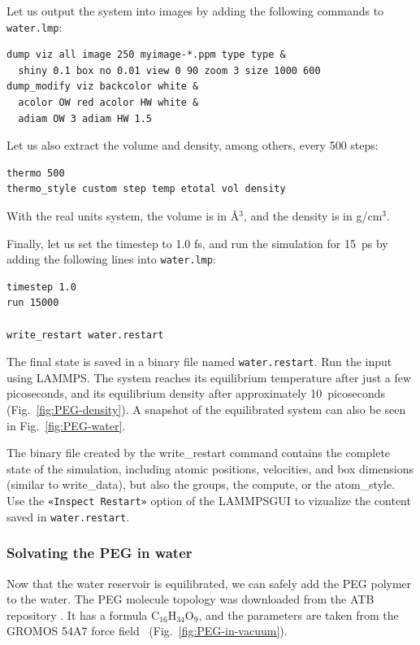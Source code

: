 \documentclass[9pt,tutorial]{livecoms}
\newcommand{\lmpcmdnote}[1]{\colorbox{note_listing}{\textcolor{command}{\small{#1}}}} %
\newcommand{\flecmd}[1]{\textcolor{command}{\texttt{#1}}} %
\newcommand{\guicmd}[1]{\textcolor{command}{\texttt{«#1»}}} %
\newcommand{\lammpsgui}{\textsf{LAMMPS\textendash GUI}}
\begin{document}
Let us output the system into images by adding the following commands to \flecmd{water.lmp}:
\begin{lstlisting}
dump viz all image 250 myimage-*.ppm type type &
  shiny 0.1 box no 0.01 view 0 90 zoom 3 size 1000 600
dump_modify viz backcolor white &
  acolor OW red acolor HW white &
  adiam OW 3 adiam HW 1.5
\end{lstlisting}
Let us also extract the volume and density, among others, every 500 steps:
\begin{lstlisting}
thermo 500
thermo_style custom step temp etotal vol density
\end{lstlisting}
With the real units system, the volume is in Å$^3$, and
the density is in g/cm$^3$.

Finally, let us set the timestep to 1.0 fs, and run the simulation for 15~ps by
adding the following lines into \flecmd{water.lmp}:
\begin{lstlisting}
timestep 1.0
run 15000

write_restart water.restart
\end{lstlisting}
The final state is saved in a binary file named \flecmd{water.restart}.
Run the input using LAMMPS.  The system reaches its equilibrium temperature
after just a few picoseconds, and its equilibrium density after approximately
10~picoseconds (Fig.~\ref{fig:PEG-density}).  A snapshot of the equilibrated
system can also be seen in Fig.~\ref{fig:PEG-water}.

\begin{note}
  The binary file created by the \lmpcmdnote{write\_restart} command contains the
  complete state of the simulation, including atomic positions, velocities, and
  box dimensions (similar to \lmpcmdnote{write\_data}), but also the groups,
  the compute, or the \lmpcmdnote{atom\_style}.  Use the \guicmd{Inspect Restart}
  option of the \lammpsgui{} to vizualize the content saved in \flecmd{water.restart}.
\end{note}

\subsubsection{Solvating the PEG in water}

Now that the water reservoir is equilibrated, we can safely add the PEG polymer
to the water.  The PEG molecule topology was downloaded from the ATB repository
\cite{malde2011automated, oostenbrink2004biomolecular}.  It has a formula
$\text{C}_{16}\text{H}_{34}\text{O}_{9}$, and the parameters are taken from
the {GROMOS} 54A7 force field~\cite{schmid2011definition} (Fig.~\ref{fig:PEG-in-vacuum}).
\end{document}
